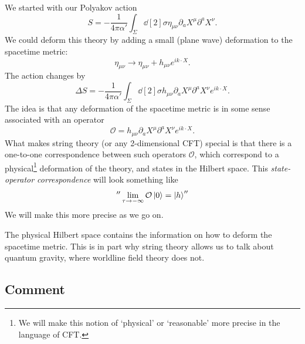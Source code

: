 We started with our Polyakov action
\begin{equation*}
  S = -\frac{1}{4 \pi \alpha'} \int_\Sigma \dd[2]{\sigma} \eta_{\mu\nu} \partial_{a} X^{\mu} \partial^{a} X^{\nu}.
\end{equation*}
We could deform this theory by adding a small (plane wave) deformation to the spacetime metric:
\begin{equation}
  \eta_{\mu\nu} \to \eta_{\mu\nu} + h_{\mu\nu} e^{i k \cdot X}.
\end{equation}
The action changes by 
\begin{equation}
  \Delta S = -\frac{1}{4 \pi \alpha'} \int_\Sigma \dd[2]{\sigma} h_{\mu\nu} \partial_{a} X^{\mu} \partial^{a} X^{\nu} e^{i k \cdot X}.
\end{equation}
The idea is that any deformation of the spacetime metric is in some sense associated with an operator
\begin{equation}
  \mathcal{O} = h_{\mu\nu} \partial_{a} X^{\mu} \partial^{a} X^{\nu} e^{i k \cdot X}.
\end{equation}
What makes string theory (or any 2-dimensional CFT) special is that there is a one-to-one correspondence between such operators $\mathcal{O}$, which correspond to a physical\footnote{We will make this notion of `physical' or `reasonable' more precise in the language of CFT.} deformation of the theory, and states in the Hilbert space.
This \emph{state-operator correspondence} will look something like
\begin{equation}
  '' \lim_{\tau \to -\infty} \mathcal{O} \ket{0} = \ket{h} ''
\end{equation}
We will make this more precise as we go on.

\begin{leftbar}
  The physical Hilbert space contains the information on how to deform the spacetime metric. This is in part why string theory allows us to talk about quantum gravity, where worldline field theory does not.
\end{leftbar}

\subsection*{Comment}%

